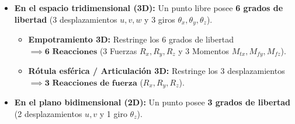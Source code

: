 \begin{itemize}

    \item \textbf{En el espacio tridimensional (3D):} Un punto libre posee \textbf{6 grados de libertad} (3 desplazamientos $u, v, w$ y 3 giros $\theta_x, \theta_y, \theta_z$).

          \begin{itemize}

              \item \textbf{Empotramiento 3D:} Restringe los 6 grados de libertad $\implies \mathbf{6\text{ Reacciones}}$ (3 Fuerzas $R_x, R_y, R_z$ y 3 Momentos $M_{tx}, M_{fy}, M_{fz}$).

              \item \textbf{Rótula esférica / Articulación 3D:} Restringe los 3 desplazamientos $\implies \mathbf{3\text{ Reacciones de fuerza}}$ ($R_x, R_y, R_z$).

          \end{itemize}

    \item \textbf{En el plano bidimensional (2D):} Un punto posee \textbf{3 grados de libertad} (2 desplazamientos $u, v$ y 1 giro $\theta_z$).

\end{itemize}



